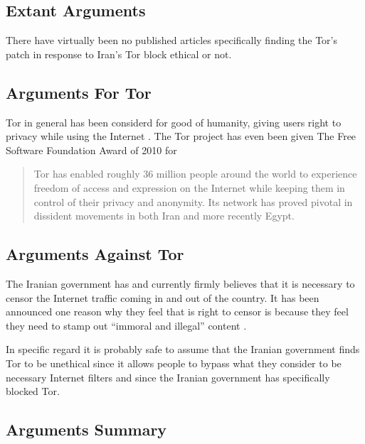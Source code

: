 \documentclass[11pt]{article}
\begin{document}
\begin{multicols}{2}
\section{Extant Arguments} 

There have virtually been no published articles specifically finding the Tor's
patch in response to Iran's Tor block ethical or not.

\subsection{Arguments For Tor}

Tor in general has been considerd for good of humanity, giving users right to
privacy while using the Internet \cite{TorCreatesSaferInternet, TorLastHope}.
The Tor project has even been given The Free Software Foundation Award of 2010
for 
\begin{quotation}Tor has enabled roughly 36 million people around the world
  to experience freedom of access and expression on the Internet while keeping
  them in control of their privacy and anonymity. Its network has proved pivotal 
  in dissident movements in both Iran and more recently Egypt.\cite{FreeSoftwareAwards}
\end{quotation}



\subsection{Arguments Against Tor}

The Iranian government has and currently firmly believes that it is necessary to
censor the Internet traffic coming in and out of the country. It has been
announced one reason why they feel that is right to censor is because they feel
they need to stamp out ``immoral and illegal'' content
\cite{CensorshipFearsRise}.

In specific regard it is probably safe to assume that the Iranian government
finds Tor to be unethical since it allows people to bypass what they consider to
be necessary Internet filters and since the Iranian government has specifically
blocked Tor\cite{IranBlocksTorSameDayFix}.


\subsection{Arguments Summary}


\end{multicols}
\end{document}
